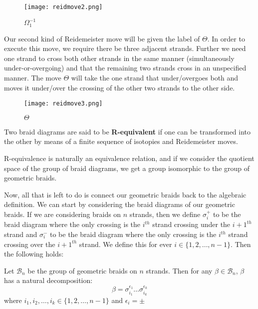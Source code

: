 \begin{figure}[H]
	\centering
	\texttt{[image: reidmove2.png]}
	\caption{$\Omega_1^{-1}$}
\end{figure}

Our second kind of Reidemeister move will be given the label of $\Theta$. In order to execute this move, we require there be three adjacent strands. Further we need one strand to cross both other strands in the same manner (simultaneously under-or-overgoing) and that the remaining two strands cross in an unspecified manner. The move $\Theta$ will take the one strand that under/overgoes both and moves it under/over the crossing of the other two strands to the other side. 

\begin{figure}[H]
	\centering
	\texttt{[image: reidmove3.png]}
	\caption{$\Theta$}
\end{figure}

\begin{definition}
	Two braid diagrams are said to be \textbf{R-equivalent} if one can be transformed into the other by means of a finite sequence of isotopies and Reidemeister moves.
\end{definition}

R-equivalence is naturally an equivalence relation, and if we consider the quotient space of the group of braid diagrams, we get a group isomorphic to the group of geometric braids.

Now, all that is left to do is connect our geometric braids back to the algebraic definition. We can start by considering the braid diagrams of our geometric braids. If we are considering braids on $n$ strands, then we define $\sigma_i^+$ to be the braid diagram where the only crossing is the $i^{th}$ strand crossing under the $i+1^{th}$ strand and $\sigma_i^-$ to be the braid diagram where the only crossing is the $i^{th}$ strand crossing over the $i+1^{th}$ strand. We define this for ever $i\in\{1,2,\hdots,n-1\}$. Then the following holds:

\begin{theorem}
	Let $\mathcal{B}_n$ be the group of geometric braids on $n$ strands. Then for any $\beta\in\mathcal{B}_n$, $\beta$ has a natural decomposition:
$$\beta = \sigma^{\epsilon_1}_{i_1}\hdots\sigma^{\epsilon_k}_{i_k}$$ 
where $i_1,i_2,\hdots,i_k\in\{1,2,\hdots,n-1\}$ and $\epsilon_i = \pm$
\end{theorem}

